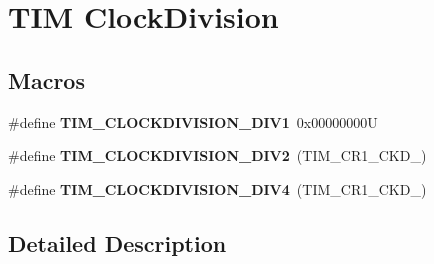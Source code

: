 \hypertarget{group___t_i_m___clock_division}{}\section{T\+IM Clock\+Division}
\label{group___t_i_m___clock_division}
\subsection*{Macros}
\begin{DoxyCompactItemize}
\item 
\mbox{\label{group___t_i_m___clock_division_ga309297ccd407a836ede6a42d4dc479c1}} 
\#define {\bfseries T\+I\+M\+\_\+\+C\+L\+O\+C\+K\+D\+I\+V\+I\+S\+I\+O\+N\+\_\+\+D\+I\+V1}~0x00000000U
\item 
\mbox{\label{group___t_i_m___clock_division_gaf84a16da8edb80a3d8af91fbfc046181}} 
\#define {\bfseries T\+I\+M\+\_\+\+C\+L\+O\+C\+K\+D\+I\+V\+I\+S\+I\+O\+N\+\_\+\+D\+I\+V2}~(T\+I\+M\+\_\+\+C\+R1\+\_\+\+C\+K\+D\+\_)
\item 
\mbox{\label{group___t_i_m___clock_division_ga7cac7491610ffc135ea9ed54f769ddbc}} 
\#define {\bfseries T\+I\+M\+\_\+\+C\+L\+O\+C\+K\+D\+I\+V\+I\+S\+I\+O\+N\+\_\+\+D\+I\+V4}~(T\+I\+M\+\_\+\+C\+R1\+\_\+\+C\+K\+D\+\_)
\end{DoxyCompactItemize}


\subsection{Detailed Description}
